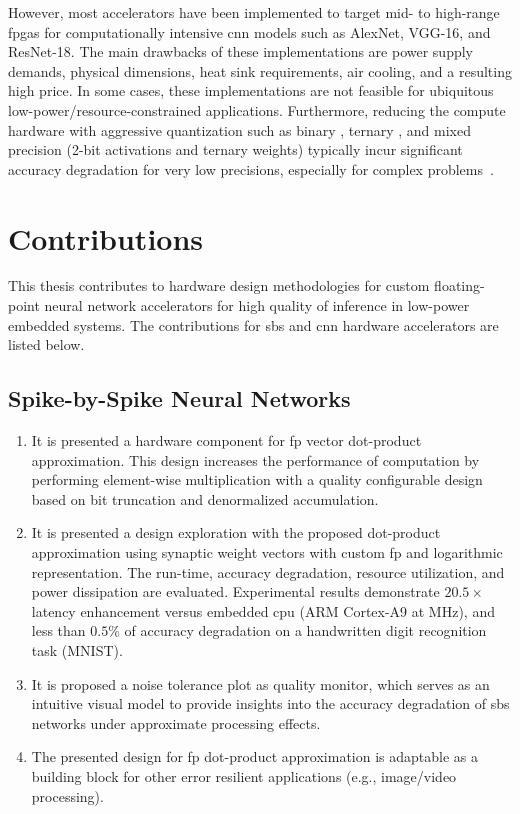 \begin{itemize}
However, most accelerators have been implemented to target mid- to high-range \glspl{fpga} for computationally intensive \gls{cnn} models such as AlexNet, VGG-16, and ResNet-18. The main drawbacks of these implementations are power supply demands, physical dimensions, heat sink requirements, air cooling, and a resulting high price. In some cases, these implementations are not feasible for ubiquitous low-power/resource-constrained applications. Furthermore, reducing the compute hardware with aggressive quantization such as binary \cite{courbariaux2015binaryconnect}, ternary \cite{lin2015neural}, and mixed precision (2-bit activations and ternary weights) \cite{colangelo2018exploration} typically incur significant accuracy degradation for very low precisions, especially for complex problems~\cite{faraone2019addnet}.

\end{itemize}

\section{Contributions}
This thesis contributes to hardware design methodologies for custom floating-point neural network accelerators for high quality of inference in
 low-power embedded systems. The contributions for \gls{sbs} and \gls{cnn} hardware accelerators are listed below.

\subsection{Spike-by-Spike Neural Networks}
\begin{enumerate}
	\item It is presented a hardware component for \gls{fp} vector dot-product approximation. This design increases the performance of computation by performing element-wise multiplication with a quality configurable design based on bit truncation and denormalized accumulation.
	\item It is presented a design exploration with the proposed dot-product approximation using synaptic weight vectors with custom \gls{fp} and logarithmic representation. The run-time, accuracy degradation, resource utilization, and power dissipation are evaluated. Experimental results demonstrate $20.5\times$ latency enhancement versus embedded \gls{cpu} (ARM Cortex-A9 at \unit[666]{MHz}), and less than $0.5\%$ of accuracy degradation on a handwritten digit recognition task (MNIST).
	\item It is proposed a noise tolerance plot as quality monitor, which serves as an intuitive visual model to provide insights into the accuracy degradation of \gls{sbs} networks under approximate processing effects.
	\item The presented design for \gls{fp} dot-product approximation is adaptable as a building block for other error resilient applications (e.g., image/video processing).
\end{enumerate}


